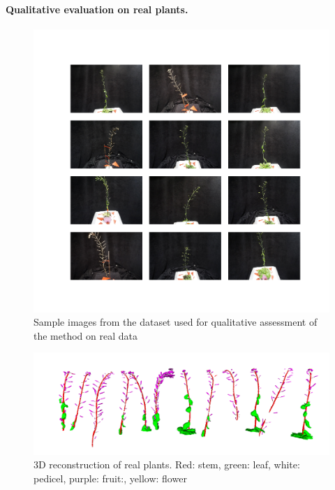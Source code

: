 \paragraph{Qualitative evaluation on real plants.}

\begin{figure}
    \centering \includegraphics[width = \linewidth]{figures/real_scans.png}
    \caption{Sample images from the dataset used for qualitative assessment of the method on real data} \label{fig:realscans}
\end{figure}

\begin{figure}
    \centering \includegraphics[width = \linewidth]{figures/3drec.png}
    \caption{3D reconstruction of real plants. Red: stem, green: leaf, white: pedicel, purple: fruit:, yellow: flower} \label{fig:rec3d}
\end{figure}

